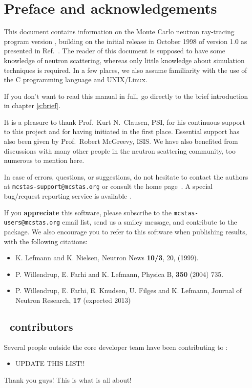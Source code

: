 
\chapter*{Preface and acknowledgements}
This document contains information on the Monte Carlo neutron
ray-tracing program \MCS version \version, building on the initial
release in October 1998 of version 1.0 as presented in Ref.~\cite{nn_10_20}. The reader of this
document is supposed to have some knowledge of neutron scattering,
whereas only little knowledge about simulation techniques is
required. In a few places, we also assume familiarity with the
use of the C programming language and UNIX/Linux.

If you don't want to read this manual in full, go directly to the brief introduction in chapter \ref{s:brief}.

It is a pleasure to thank Prof.~Kurt N.~Clausen, PSI, for his continuous
support to this project and for having initiated \MCS in the first
place. Essential support has also been given by Prof.~Robert McGreevy, ISIS.
We have also benefited from discussions with many other people in the neutron scattering
community, too numerous to mention here.

In case of errors, questions, or suggestions, do not hesitate to
contact the authors at \verb+mcstas-support@mcstas.org+
or consult the \MCS home page~\cite{mcstas_webpage}.
A special bug/request reporting service is available \cite{mczilla_webpage}.

If you {\bf appreciate} this software, please subscribe to the \verb+mcstas-users@mcstas.org+ email list, send us a smiley message, and contribute to the package. We also encourage you to refer to this software when publishing results, with the following citations:
\begin{itemize}
\item{K. Lefmann and K. Nielsen, Neutron News {\bf 10/3}, 20, (1999).}
\item{P. Willendrup, E. Farhi and K. Lefmann, Physica B, {\bf 350} (2004) 735.}
\item{P. Willendrup, E. Farhi, E. Knudsen, U. Filges and K. Lefmann,
    Journal of Neutron Research, {\bf 17} (expected 2013)}
\end{itemize}


\section*{\MCS \version\ contributors}
Several people outside the core developer team have been contributing
to \MCS \version:
\begin{itemize}
\item UPDATE THIS LIST!!
\end{itemize}
Thank you guys! This is what \MCS is all about!

